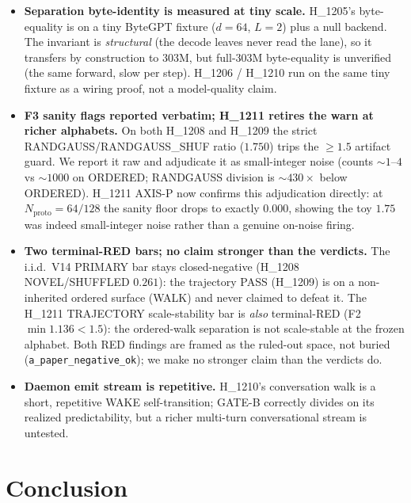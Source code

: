 \documentclass[11pt,a4paper]{article}
\begin{document}
\begin{itemize}
      mechanism, which licenses the closed-negatives' numpy legs, but the
      mechanism is deliberately simple.
\item \textbf{Separation byte-identity is measured at tiny scale.} H\_1205's
      byte-equality is on a tiny ByteGPT fixture ($d=64$, $L=2$) plus a null
      backend. The invariant is \emph{structural} (the decode leaves never read
      the lane), so it transfers by construction to $303$M, but full-$303$M
      byte-equality is unverified (the same forward, slow per step). H\_1206 /
      H\_1210 run on the same tiny fixture as a wiring proof, not a model-quality
      claim.
\item \textbf{F3 sanity flags reported verbatim; H\_1211 retires the warn at
      richer alphabets.} On both H\_1208 and H\_1209 the strict
      RANDGAUSS/RANDGAUSS\_SHUF ratio ($1.750$) trips the $\ge 1.5$ artifact
      guard. We report it raw and adjudicate it as small-integer noise (counts
      $\sim 1$--$4$ vs $\sim 1000$ on ORDERED; RANDGAUSS division is
      $\sim 430\times$ below ORDERED). H\_1211 AXIS-P now confirms this
      adjudication directly: at $N_{\text{proto}}{=}64/128$ the sanity floor
      drops to exactly $0.000$, showing the toy $1.75$ was indeed small-integer
      noise rather than a genuine on-noise firing.
\item \textbf{Two terminal-RED bars; no claim stronger than the verdicts.} The
      i.i.d.\ V14 PRIMARY bar stays closed-negative (H\_1208 NOVEL/SHUFFLED
      $0.261$): the trajectory PASS (H\_1209) is on a non-inherited ordered
      surface (WALK) and never claimed to defeat it. The H\_1211 TRAJECTORY
      scale-stability bar is \emph{also} terminal-RED (F2 $\min 1.136 < 1.5$): the
      ordered-walk separation is not scale-stable at the frozen alphabet. Both
      RED findings are framed as the ruled-out space, not buried
      (\verb|a_paper_negative_ok|); we make no stronger claim than the verdicts
      do.
\item \textbf{Daemon emit stream is repetitive.} H\_1210's conversation walk is
      a short, repetitive WAKE self-transition; GATE-B correctly divides on its
      realized predictability, but a richer multi-turn conversational stream is
      untested.
\end{itemize}

\section{Conclusion}
\label{sec:conclusion}
\end{document}
